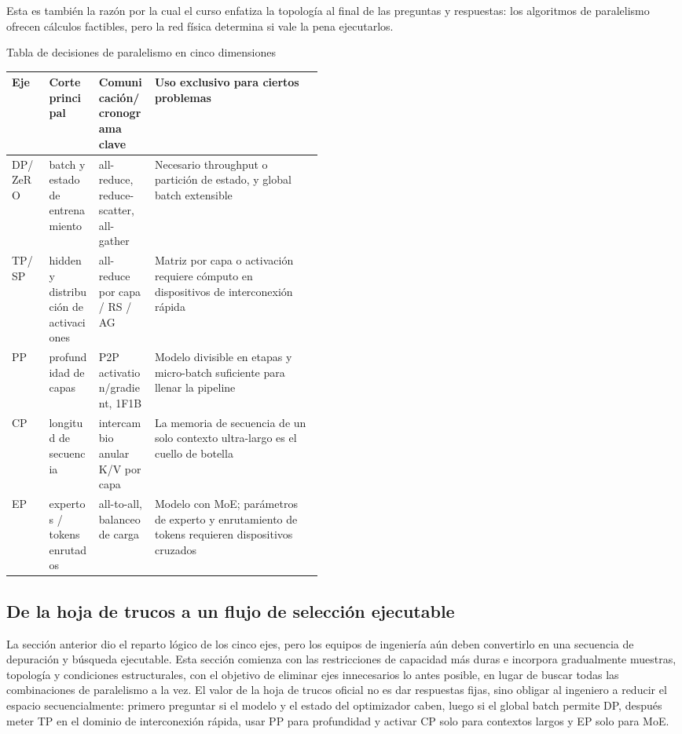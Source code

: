 \documentclass[a4paper]{article}
\begin{document}
Esta es también la razón por la cual el curso enfatiza la topología al final de las preguntas y respuestas: los algoritmos de paralelismo ofrecen cálculos factibles, pero la red física determina si vale la pena ejecutarlos.

\begin{knowledgebox}{Tabla de decisiones de paralelismo en cinco dimensiones}
\begin{tabularx}{\linewidth}{L{0.12\linewidth} L{0.16\linewidth} L{0.18\linewidth} X}
\toprule
Eje & Corte principal & Comunicación/cronograma clave & Uso exclusivo para ciertos problemas \\
\midrule
DP/ZeRO & batch y estado de entrenamiento & all-reduce, reduce-scatter, all-gather & Necesario throughput o partición de estado, y global batch extensible \\
TP/SP & hidden y distribución de activaciones & all-reduce por capa / RS / AG & Matriz por capa o activación requiere cómputo en dispositivos de interconexión rápida \\
PP & profundidad de capas & P2P activation/gradient, 1F1B & Modelo divisible en etapas y micro-batch suficiente para llenar la pipeline \\
CP & longitud de secuencia & intercambio anular K/V por capa & La memoria de secuencia de un solo contexto ultra-largo es el cuello de botella \\
EP & expertos / tokens enrutados & all-to-all, balanceo de carga & Modelo con MoE; parámetros de experto y enrutamiento de tokens requieren dispositivos cruzados \\
\bottomrule
\end{tabularx}
\end{knowledgebox}

\subsection{De la hoja de trucos a un flujo de selección ejecutable}

La sección anterior dio el reparto lógico de los cinco ejes, pero los equipos de ingeniería aún deben convertirlo en una secuencia de depuración y búsqueda ejecutable. Esta sección comienza con las restricciones de capacidad más duras e incorpora gradualmente muestras, topología y condiciones estructurales, con el objetivo de eliminar ejes innecesarios lo antes posible, en lugar de buscar todas las combinaciones de paralelismo a la vez. El valor de la hoja de trucos oficial no es dar respuestas fijas, sino obligar al ingeniero a reducir el espacio secuencialmente: primero preguntar si el modelo y el estado del optimizador caben, luego si el global batch permite DP, después meter TP en el dominio de interconexión rápida, usar PP para profundidad y activar CP solo para contextos largos y EP solo para MoE.
\end{document}
